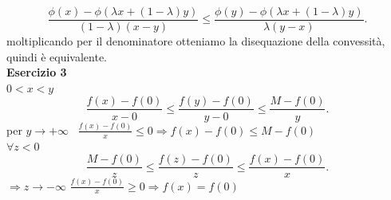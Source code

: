 \documentclass[12px]{article}
\begin{document}
	\[
		\frac{ \phi (x) - \phi( \lambda x + (1 - \lambda)y)}{(1 - \lambda)(x - y)}\leq \frac{ \phi(y) - \phi( \lambda x + (1- \lambda)y)}{ \lambda (y-x)}
	.\] 
	moltiplicando per il denominatore otteniamo la disequazione della convessità, quindi è equivalente.\\
	\textbf{Esercizio 3}\\
	$0 < x < y$\\
	 \[
		 \frac{f(x) - f(0)}{x-0} \leq \frac{f(y)-f(0)}{y-0}\leq \frac{M - f(0)}{y}
	 .\] 
	 per $y \rightarrow +\infty$ \ $\displaystyle \frac { f(x) - f(0)}x \leq 0 \Rightarrow f(x) - f(0)\leq M - f(0)$\\
	 $\forall z < 0$\\
	  \[
		  \frac{M-f(0)}z\leq \frac{f (z) - f(0)}z\leq \frac{f(x) - f(0)}x
	 .\] 
	 $ \Rightarrow  z \rightarrow - \infty$  $\frac{f(x)-f(0)}{x}\geq 0 \Rightarrow  f(x) = f(0)$
\end{document}
